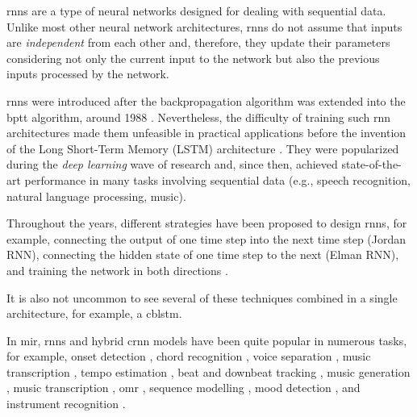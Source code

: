 

\glspl{rnn} are a type of neural networks designed for
dealing with sequential data. Unlike most other neural
network architectures, \glspl{rnn} do not assume that inputs
are \emph{independent} from each other and, therefore, they
update their parameters considering not only the current
input to the network but also the previous inputs processed
by the network.

\glspl{rnn} were introduced after the backpropagation
algorithm \parencite{rumelhart1988learning} was extended
into the \gls{bptt} algorithm, around 1988
\parencite{werbos1988generalization,
werbos1990backpropagation}. Nevertheless, the difficulty of
training such \gls{rnn} architectures made them unfeasible
in practical applications before the invention of the Long
Short-Term Memory (LSTM) architecture
\parencite{hochreiter1997long}. They were popularized during
the \emph{deep learning} wave of research and, since then,
achieved state-of-the-art performance in many tasks
involving sequential data (e.g., speech recognition, natural
language processing, music).

Throughout the years, different strategies have been
proposed to design \glspl{rnn}, for example, connecting the
output of one time step into the next time step (Jordan
RNN), connecting the hidden state of one time step to the
next (Elman RNN), and training the network in both
directions \parencite{schuster1997bidirectional}.

It is also not uncommon to see several of these techniques
combined in a single architecture, for example, a
\gls{cblstm}.

In \gls{mir}, \glspl{rnn} and hybrid \gls{crnn} models have
been quite popular in numerous tasks, for example, onset
detection \parencite{eyben2010universal}, chord recognition
\parencite{boulangerlewandowski2013audio, sigtia2016endend,
sears2018evaluating}, voice separation
\parencite{huang2014singingvoice}, music transcription
\parencite{sigtia2014rnnbased}, tempo estimation
\parencite{bock2015accurate}, beat and downbeat tracking
\parencite{bock2016joint, krebs2016downbeat}, music
generation \parencite{liu2016predicting, liang2017automatic,
lim2017chord}, music transcription
\parencite{rigaud2016singing, sigtia2016endend,
southall2016automatic, vogl2016recurrent,
southall2017automatic, vogl2017drum, basaran2018main},
\gls{omr} \parencite{calvozaragoza2017onestep,
wel2017optical, calvozaragoza2018cameraprimus}, sequence
modelling \parencite{ycart2017study}, mood detection
\parencite{delbouys2018music}, and instrument recognition
\parencite{gururani2018instrument}.



